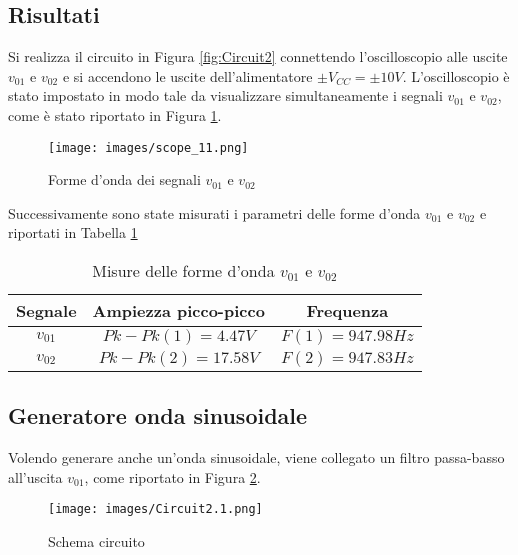 \subsection{Risultati}
Si realizza il circuito in Figura \ref{fig:Circuit2} connettendo l'oscilloscopio alle uscite $v_{01} \text{ e }v_{02}$ e si accendono le uscite dell'alimentatore $\pm V_{CC}=\pm 10V$. L'oscilloscopio è stato impostato in modo tale da visualizzare simultaneamente i segnali $v_{01} \text{ e }v_{02}$, come è stato riportato in Figura \ref{fig:Ris2}.
\begin{figure}[H]
    \centering
    \texttt{[image: images/scope\_11.png]}
    \caption{Forme d'onda dei segnali $v_{01} \text{ e }v_{02}$}
    \label{fig:Ris2}
\end{figure}
Successivamente sono state misurati i parametri delle forme d'onda $v_{01} \text{ e }v_{02}$ e riportati in Tabella \ref{tab:Ris2}
\begin{table}[H]
    \centering
    \begin{tabular}{||c|c|c||}
        \hline
        Segnale&Ampiezza picco-picco&Frequenza \\\hline\hline
        $v_{01}$&$Pk-Pk(1)=4.47V$&$F(1)=947.98Hz$\\\hline
        $v_{02}$&$Pk-Pk(2)=17.58V$&$F(2)=947.83Hz$\\\hline
    \end{tabular}
    \caption{Misure delle forme d'onda $v_{01} \text{ e }v_{02}$}
    \label{tab:Ris2}
\end{table}
\clearpage
\subsection{Generatore onda sinusoidale}
Volendo generare anche un'onda sinusoidale, viene collegato un filtro passa-basso all'uscita $v_{01}$, come riportato in Figura \ref{fig:Circuit2.1}.
\begin{figure}[H]
    \centering
    \texttt{[image: images/Circuit2.1.png]}
    \caption{Schema circuito}
    \label{fig:Circuit2.1}
\end{figure}

